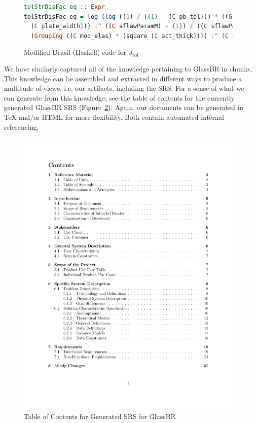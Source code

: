 \documentclass[sigconf]{acmart}
\newcommand{\jtol}{$J_{\mbox{tol}}$}
\begin{document}
\begin{figure}
\begin{lstlisting}[language=Haskell, frame=single, showstringspaces=false]
tolStrDisFac_eq :: Expr
tolStrDisFac_eq = log (log ((1) / ((1) - (C pb_tol))) * ((Grouping ((C plate_len) * 
  (C plate_width))) :^ ((C sflawParamM) - (1)) / ((C sflawParamK) * 
  (Grouping ((C mod_elas) * (square (C act_thick)))) :^ (C sflawParamM) * (C loadDF))))
\end{lstlisting}
\caption{Modified Drasil (Haskell) code for \jtol{}}
\label{Fig_JtolDrasil_fix}
\end{figure}

We have similarly captured all of the knowledge pertaining to GlassBR in chunks.
This knowledge can be assembled and extracted in different ways to produce a 
multitude of views, i.e. our artifacts, including the SRS. For a sense of what 
we can generate from this knowledge, see the table of contents for the currently
generated GlassBR SRS (Figure~\ref{Fig_ToCGlassBRSRS}). Again, our documents can
be generated in TeX and/or HTML for more flexibility. Both contain automated 
internal referencing.

\begin{figure}
\begin{center}
\includegraphics[scale=0.5]{./figures/TofC.pdf}
\end{center}
\caption{Table of Contents for Generated SRS for GlassBR}
\label{Fig_ToCGlassBRSRS}
\end{figure}
\end{document}
